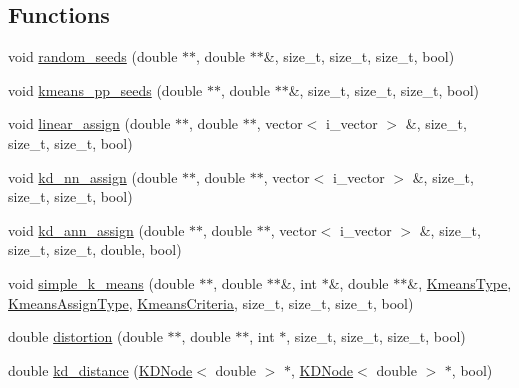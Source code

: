\subsection*{Functions}
\begin{DoxyCompactItemize}
\item 
void \hyperlink{namespaceSimpleCluster_a7220a80d5dfa93f7bee701a9abd606e9}{random\+\_\+seeds} (double $\ast$$\ast$, double $\ast$$\ast$\&, size\+\_\+t, size\+\_\+t, size\+\_\+t, bool)
\item 
void \hyperlink{namespaceSimpleCluster_a26dcc8efa5e3bd2663d90c07c8910ada}{kmeans\+\_\+pp\+\_\+seeds} (double $\ast$$\ast$, double $\ast$$\ast$\&, size\+\_\+t, size\+\_\+t, size\+\_\+t, bool)
\item 
void \hyperlink{namespaceSimpleCluster_a8576edc91afddb43f8afbeb432ef71f1}{linear\+\_\+assign} (double $\ast$$\ast$, double $\ast$$\ast$, vector$<$ i\+\_\+vector $>$ \&, size\+\_\+t, size\+\_\+t, size\+\_\+t, bool)
\item 
void \hyperlink{namespaceSimpleCluster_a2b33da107293a0437ecae4e2f4a542f7}{kd\+\_\+nn\+\_\+assign} (double $\ast$$\ast$, double $\ast$$\ast$, vector$<$ i\+\_\+vector $>$ \&, size\+\_\+t, size\+\_\+t, size\+\_\+t, bool)
\item 
void \hyperlink{namespaceSimpleCluster_a8c738770af7344c7547016a6b8859463}{kd\+\_\+ann\+\_\+assign} (double $\ast$$\ast$, double $\ast$$\ast$, vector$<$ i\+\_\+vector $>$ \&, size\+\_\+t, size\+\_\+t, size\+\_\+t, double, bool)
\item 
void \hyperlink{namespaceSimpleCluster_a81cc95b28c2dbf13507df024fe8213fe}{simple\+\_\+k\+\_\+means} (double $\ast$$\ast$, double $\ast$$\ast$\&, int $\ast$\&, double $\ast$$\ast$\&, \hyperlink{namespaceSimpleCluster_a8a8f57121b69a7b43575e4d6a53928e2}{Kmeans\+Type}, \hyperlink{namespaceSimpleCluster_a1ad2d6129171ff9a5ee57f48b5f3f6e1}{Kmeans\+Assign\+Type}, \hyperlink{structSimpleCluster_1_1KmeansCriteria}{Kmeans\+Criteria}, size\+\_\+t, size\+\_\+t, size\+\_\+t, bool)
\item 
double \hyperlink{namespaceSimpleCluster_a906f27865548931fd05261b39021af1e}{distortion} (double $\ast$$\ast$, double $\ast$$\ast$, int $\ast$, size\+\_\+t, size\+\_\+t, size\+\_\+t, bool)
\item 
double \hyperlink{namespaceSimpleCluster_ab268f110e34b3762c1de5b7fe4eda10c}{kd\+\_\+distance} (\hyperlink{classSimpleCluster_1_1KDNode}{K\+D\+Node}$<$ double $>$ $\ast$, \hyperlink{classSimpleCluster_1_1KDNode}{K\+D\+Node}$<$ double $>$ $\ast$, bool)
\item 
$$
\end{DoxyCompactItemize}
